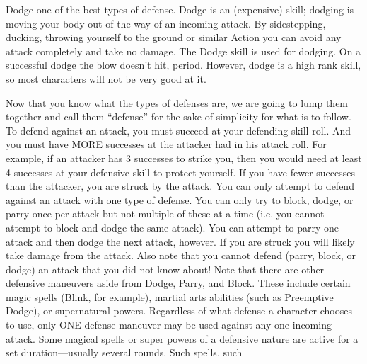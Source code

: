 \documentclass[twoside]{book}
\begin{document}
                
                
                 Dodge   
                   one of the best types of defense. Dodge is an
                   (expensive) skill; dodging is moving your body out of
                   the way of an incoming attack. By sidestepping,
                   ducking, throwing yourself to the ground or similar
                   Action you can avoid any attack completely and take no
                   damage. The Dodge skill is used for dodging. On a
                   successful dodge the blow doesn’t hit, period.
                   However, dodge is a high rank skill, so most
                   characters will not be very good at it. 
                
             Now that you know what the types of defenses are, we
               are going to lump them together and call them
               “defense” for the sake of simplicity for what
               is to follow.  To defend against an attack, you must succeed at
               your defending skill roll. And you must have MORE
               successes at the attacker had in his attack roll. For
               example, if an attacker has 3 successes to strike you,
               then you would need at least 4 successes at your defensive
               skill to protect yourself. If you have fewer successes
               than the attacker, you are struck by the attack. You can
               only attempt to defend against an attack with one type of
               defense. You can only try to block, dodge, or parry once
               per attack but not multiple of these at a time (i.e. you
               cannot attempt to block and dodge the same attack). You
               can attempt to parry one attack and then dodge the next
               attack, however.  If you are struck you will likely take damage from
               the attack. Also note that you cannot defend (parry,
               block, or dodge) an attack that you did not know about!
                Note that there are other defensive maneuvers
              aside from Dodge, Parry, and Block. These include
              certain magic spells (Blink, for example), martial arts
              abilities (such as Preemptive Dodge), or supernatural
              powers. Regardless of what defense a character chooses
              to use, only ONE defense maneuver may be used against
              any one incoming attack. Some magical spells or
              super powers of a defensive nature are active for a set
              duration—usually several rounds. Such spells, such
\end{document}
